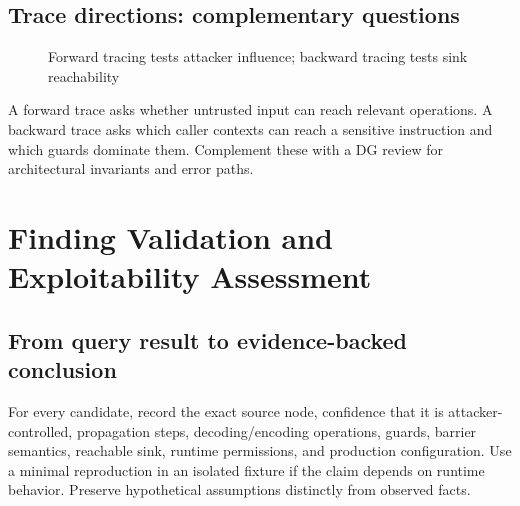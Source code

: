 \documentclass[11pt,letterpaper,oneside]{book}
\begin{document}
\section{Trace directions: complementary questions}

\begin{figure}[htbp]\centering
{}\caption{Forward tracing tests attacker influence; backward tracing tests sink reachability}\end{figure}

A forward trace asks whether untrusted input can reach relevant operations. A backward trace asks which caller contexts can reach a sensitive instruction and which guards dominate them. Complement these with a DG review for architectural invariants and error paths.

\chapter{Finding Validation and Exploitability Assessment}

\section{From query result to evidence-backed conclusion}

For every candidate, record the exact source node, confidence that it is attacker-controlled, propagation steps, decoding/encoding operations, guards, barrier semantics, reachable sink, runtime permissions, and production configuration. Use a minimal reproduction in an isolated fixture if the claim depends on runtime behavior. Preserve hypothetical assumptions distinctly from observed facts.
\end{document}
